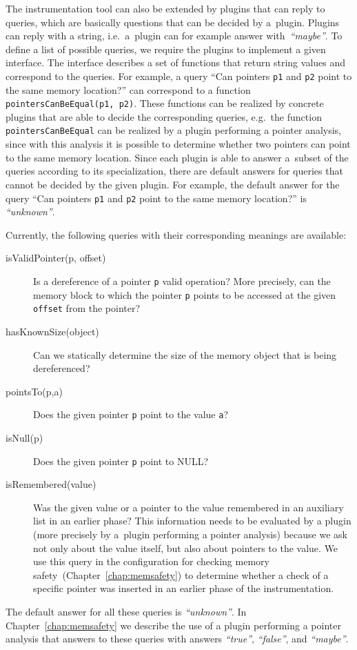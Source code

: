 The instrumentation tool can also be extended by plugins that can reply to
queries, which are basically questions that can be decided by a~plugin. Plugins
can reply with a string, i.e.~a~plugin can for example answer
with~\emph{``maybe''}.  To define a list of possible queries, we require the
plugins to implement a given interface. The interface describes a set of
functions that return string values and correspond to the queries. For example,
a query ``Can pointers \texttt{p1} and \texttt{p2} point to the same memory
location?'' can correspond to a function \texttt{pointersCanBeEqual(p1, p2)}.
These functions can be realized by concrete plugins that are able to decide
the corresponding queries, e.g.~the function \texttt{pointersCanBeEqual} can be
realized by a plugin performing a pointer analysis, since with this analysis
it is possible to determine whether two pointers can point to the same memory
location. Since each plugin is able to answer a~subset of the queries
according to its specialization, there are default answers for queries that
cannot be decided by the given plugin. For example, the default answer for the
query ``Can pointers \texttt{p1} and \texttt{p2} point to the same memory
location?'' is \emph{``unknown''}.

Currently, the following queries with their corresponding meanings are available:
\begin{description}
  \item[isValidPointer(p, offset)] Is a dereference of a pointer \texttt{p}
  valid operation? More precisely, can the memory block to which the pointer
  \texttt{p} points to be accessed at the given \texttt{offset} from the pointer?
  \item[hasKnownSize(object)] Can we statically determine the size of the memory
         object that is being dereferenced?
  \item[pointsTo(p,a)] Does the given pointer \texttt{p} point to the value \texttt{a}?
  \item[isNull(p)] Does the given pointer \texttt{p} point to NULL?
  \item[isRemembered(value)] Was the given value or a pointer to the value
  remembered in an auxiliary list in an earlier phase? This information needs
  to be evaluated by a plugin (more precisely by a~plugin performing a pointer
  analysis) because we ask not only about the value itself, but also about
  pointers to the value. We use this query in the configuration for checking
  memory safety~(Chapter~\ref{chap:memsafety}) to
  determine whether a check of a specific pointer was inserted in an earlier
  phase of the instrumentation.
\end{description}
The default answer for all these queries is \emph{``unknown''}. In
Chapter~\ref{chap:memsafety} we describe the use of a plugin performing a
pointer analysis that answers to these queries with answers \emph{``true''},
\emph{``false''}, and \emph{``maybe''}.

